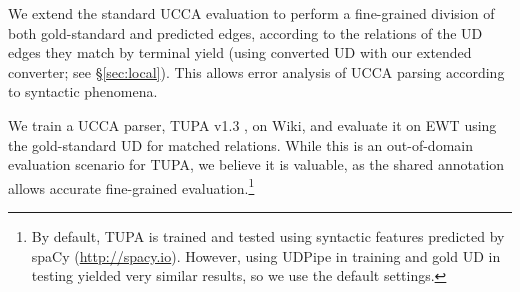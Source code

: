 \documentclass[11pt,a4paper]{article}
\begin{document}
We extend the standard UCCA evaluation to perform a fine-grained division
of both gold-standard and predicted edges,
according to the relations of the UD edges they match by terminal yield
(using converted UD with our extended converter; see \S\ref{sec:local}).
This allows error analysis of UCCA parsing according to syntactic phenomena.

We train a UCCA parser,
TUPA v1.3 \cite{hershcovich2017a,hershcovich2018multitask},
on Wiki, and evaluate it on EWT
using the gold-standard UD for matched relations.
While this is an out-of-domain evaluation scenario for TUPA,
we believe it is valuable,
as the shared annotation allows accurate fine-grained
evaluation.\footnote{By default, TUPA is trained and tested using syntactic features
predicted by spaCy (\url{http://spacy.io}).
However, using UDPipe in training and gold UD in testing yielded very similar
results, so we use the default settings.}


%


%

%
\end{document}
